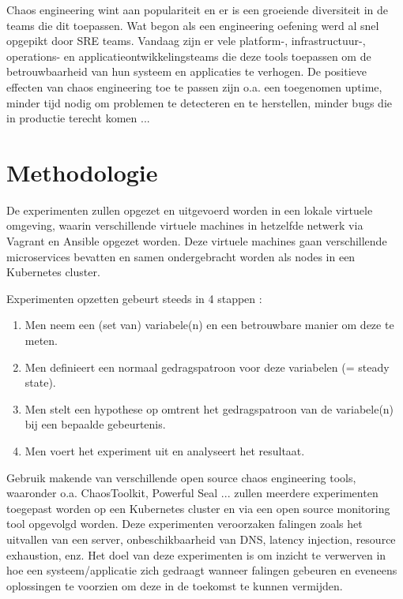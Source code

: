 Chaos engineering wint aan populariteit en er is een groeiende diversiteit in de teams die dit toepassen. Wat begon als een engineering oefening werd al snel opgepikt door SRE teams. Vandaag zijn er vele platform-, infrastructuur-, operations- en applicatieontwikkelingsteams die deze tools toepassen om de betrouwbaarheid van hun systeem en applicaties te verhogen.
De positieve effecten van chaos engineering toe te passen zijn o.a. een toegenomen uptime, minder tijd nodig om problemen te detecteren en te herstellen, minder bugs die in productie terecht komen ... \autocite{KoltonAndrus2021}


\section{Methodologie}
\label{sec:methodologie}

De experimenten zullen opgezet en uitgevoerd worden in een lokale virtuele omgeving, waarin verschillende virtuele machines in hetzelfde netwerk via Vagrant en Ansible opgezet worden. Deze virtuele machines gaan  verschillende microservices bevatten en samen ondergebracht worden als nodes in een Kubernetes cluster. 

Experimenten opzetten gebeurt steeds in 4 stappen \autocite{Pawlikowski2020}:
\begin{enumerate}
    \item Men neem een (set van) variabele(n) en een betrouwbare manier om deze te meten.
    \item Men definieert een normaal gedragspatroon voor deze variabelen (= steady state).
    \item Men stelt een hypothese op omtrent het gedragspatroon van de variabele(n) bij een bepaalde gebeurtenis.
    \item Men voert het experiment uit en analyseert het resultaat.
\end{enumerate}
Gebruik makende van verschillende open source chaos engineering tools, waaronder o.a. ChaosToolkit, Powerful Seal ... zullen meerdere experimenten toegepast worden op een Kubernetes cluster en via een open source monitoring tool opgevolgd worden. Deze experimenten veroorzaken falingen zoals het uitvallen van een server, onbeschikbaarheid van DNS, latency injection, resource exhaustion, enz. Het doel van deze experimenten is om inzicht te verwerven in hoe een systeem/applicatie zich gedraagt wanneer falingen gebeuren en eveneens oplossingen te voorzien om deze in de toekomst te kunnen vermijden. 


